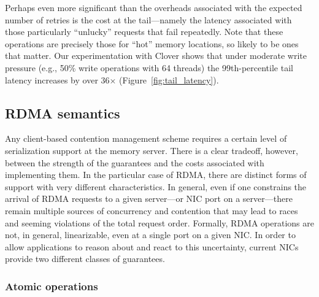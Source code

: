 Perhaps even more significant than the overheads associated with the
expected number of retries is the cost at the tail---namely the
latency associated with those particularly ``unlucky'' requests that
fail repeatedly.  Note that these operations are precisely those for
``hot'' memory locations, so likely to be ones that matter.  Our
experimentation with Clover shows that under moderate write pressure
(e.g., 50\% write operations with 64 threads) the 99th-percentile tail
latency increases by over 36$\times$ (Figure~\ref{fig:tail_latency}).



\subsection{RDMA semantics}

Any client-based contention management scheme requires a certain level
of serialization support at the memory server.  There is a clear
tradeoff, however, between the strength of the guarantees and the
costs associated with implementing them.  In the particular case of
RDMA, there are distinct forms of support with very different
characteristics.  In general, even if one constrains the arrival of
RDMA requests to a given server---or NIC port on a server---there
remain multiple sources of concurrency and contention that may lead to
races and seeming violations of the total request order.
Formally, RDMA operations are not, in general, linearizable, even at a
single port on a given NIC.  In order to allow applications to reason
about and react to this uncertainty, current NICs provide two
different classes of guarantees.

\subsubsection{Atomic operations}

